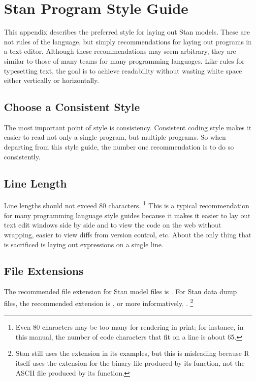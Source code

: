 \chapter{Stan Program Style Guide}

\noindent
This appendix describes the preferred style for laying out Stan
models. These are not rules of the language, but simply
recommendations for laying out programs in a text editor.  Although
these recommendations may seem arbitrary, they are similar to those of
many teams for many programming languages.  Like rules for typesetting
text, the goal is to achieve readability without wasting white space
either vertically or horizontally.

\section{Choose a Consistent Style}

The most important point of style is consistency.  Consistent coding
style makes it easier to read not only a single program, but multiple
programs.  So when departing from this style guide, the number one
recommendation is to do so consistently.

\section{Line Length}

Line lengths should not exceed 80 characters.%
%
\footnote{Even 80 characters may be too many for rendering in print;
  for instance, in this manual, the number of code characters that fit
  on a line is about 65.}
%
This is a typical recommendation for many programming language style
guides because it makes it easier to lay out text edit windows side by
side and to view the code on the web without wrapping, easier to view
diffs from version control, etc.  About the only thing that is
sacrificed is laying out expressions on a single line.

\section{File Extensions}

The recommended file extension for Stan model files is .  
For Stan data dump files, the recommended extension is , or
more informatively, .%
%
\footnote{Stan still uses the  extension in its examples,
  but this is misleading because R itself uses the extension
   for the binary file produced by its 
  function, not the ASCII file produced by its  function.}


